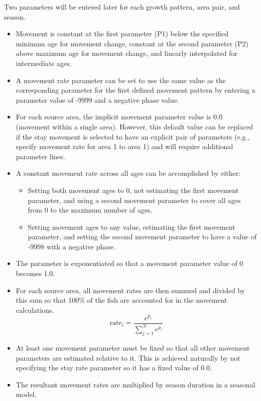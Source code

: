 Two parameters will be entered later for each growth pattern, area pair, and season.   
\begin{itemize}
	\item Movement is constant at the first parameter (P1) below the specified minimum age for movement change, constant at the second parameter (P2) above maximum age for movement change, and linearly interpolated for intermediate ages.
	\item A movement rate parameter can be set to use the same value as the corresponding parameter for the first defined movement pattern by entering a parameter value of -9999 and a negative phase value.
	\item For each source area, the implicit movement parameter value is 0.0 (movement within a single area). However, this default value can be replaced if the stay movement is selected to have an explicit pair of parameters (e.g., specify movement rate for area 1 to area 1) and will require additional parameter lines.
	\item A constant movement rate across all ages can be accomplished by either:
	\begin{itemize}
		\item Setting both movement ages to 0, not estimating the first movement parameter, and using a second movement parameter to cover all ages from 0 to the maximum number of ages.
		\item Setting movement ages to any value, estimating the first movement parameter, and setting the second movement parameter to have a value of -9998 with a negative phase.
	\end{itemize} 
	\item The parameter is exponentiated so that a movement parameter value of 0 becomes 1.0.
	\item For each source area, all movement rates are then summed and divided by this sum so that 100\% of the fish are accounted for in the movement calculations.
	\begin{equation}
	\text{rate}_i = \frac{e^{p_i}}{\sum_{j=1}^{N}e^{p_i}}
	\end{equation}
	\item At least one movement parameter must be fixed so that all other movement parameters are estimated relative to it.  This is achieved naturally by not specifying the stay rate parameter so it has a fixed value of 0.0.
	\item The resultant movement rates are multiplied by season duration in a seasonal model.	
\end{itemize}


